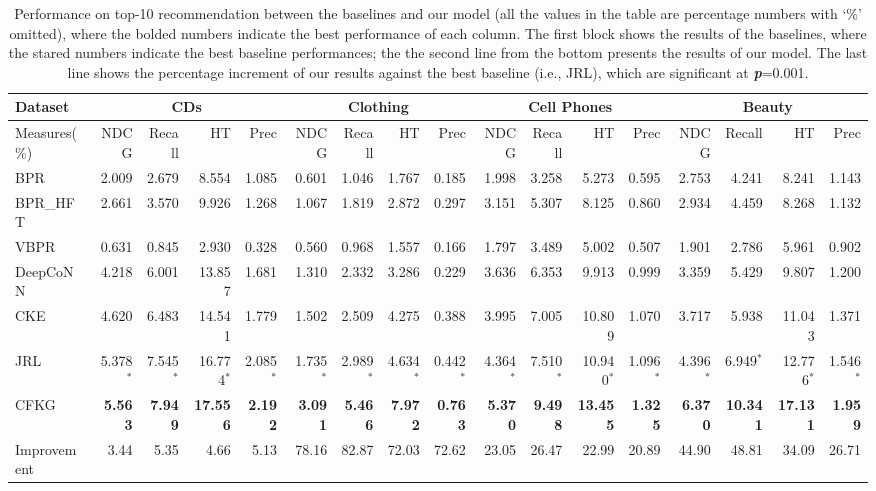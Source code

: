 \documentclass[algorithms,article,accept,moreauthors,pdftex,10pt,a4paper]{Definitions/mdpi}
\begin{document}
\iffalse
\begin{table*}[t]
	\caption{Performance on top-10 recommendation between the baselines and our model (all the values in the table are percentage numbers with `\%' omitted), where the bolded numbers indicate the best performance of each column.
		The first block shows the results of the baselines, where the stared numbers indicate the best baseline performances; 
		the the second line from the bottom presents the results of our model. 
		The last line shows the percentage increment of our results against the best baseline (i.e., JRL), which are significant at \textit{\textbf{p}}=0.001.}
	\centering
	\vspace{-5pt}
	\setlength{\tabcolsep}{2pt}
	\begin{tabular}
		{l|rrrr|rrrr|rrrr|rrrr} \hline\hline
		Dataset &  \multicolumn{4}{c|}{CDs} & \multicolumn{4}{c|}{Clothing} & \multicolumn{4}{c|}{Cell Phones} & \multicolumn{4}{c}{Beauty}\\\hline
		Measures(\%) & NDCG & Recall & HT & Prec & NDCG & Recall & HT & Prec & NDCG & Recall & HT & Prec & NDCG & Recall & HT & Prec \\\hline
		BPR  & 2.009 & 2.679 & 8.554 & 1.085 & 0.601 & 1.046 & 1.767 & 0.185 & 1.998 & 3.258 & 5.273 & 0.595 & 2.753 & 4.241 & 8.241 & 1.143\\
		BPR\_HFT & 2.661 & 3.570 & 9.926 & 1.268 & 1.067 & 1.819 & 2.872 & 0.297 & 3.151 & 5.307 & 8.125 & 0.860 & 2.934  & 4.459 & 8.268 & 1.132\\
		VBPR & 0.631 & 0.845 & 2.930 & 0.328 & 0.560 & 0.968 & 1.557 & 0.166 & 1.797 & 3.489 & 5.002 & 0.507 & 1.901 & 2.786 & 5.961 & 0.902\\
		DeepCoNN  & 4.218 & 6.001 & 13.857 & 1.681 & 1.310 & 2.332 & 3.286 & 0.229 & 3.636 & 6.353 & 9.913 & 0.999 & 3.359 & 5.429 & 9.807 & 1.200\\
		CKE  & 4.620 & 6.483 & 14.541 & 1.779 & 1.502 & 2.509 & 4.275 & 0.388 & 3.995 & 7.005 & 10.809 & 1.070 & 3.717 & 5.938 & 11.043 & 1.371\\
		JRL & {5.378}$^*$ & {7.545}$^*$ & {16.774}$^*$ & {2.085}$^*$ & {1.735}$^*$ & {2.989}$^*$ & {4.634}$^*$ & {0.442}$^*$ & {4.364}$^*$ & {7.510}$^*$ & {10.940}$^*$ & {1.096}$^*$ & {4.396}$^*$ & {6.949}$^*$ & {12.776}$^*$ & {1.546}$^*$\\\hline
		CFKG & \textbf{5.563} & \textbf{7.949} & \textbf{17.556} & \textbf{2.192} & \textbf{3.091} & \textbf{5.466} & \textbf{7.972} & \textbf{0.763} & \textbf{5.370} & \textbf{9.498} & \textbf{13.455} & \textbf{1.325} & \textbf{6.370} & \textbf{10.341} & \textbf{17.131} & \textbf{1.959}\\\hline
		Improvement & 3.44 & 5.35  & 4.66 & 5.13 & 78.16 & 82.87 & 72.03 & 72.62 & 23.05 & 26.47 & 22.99 & 20.89 & 44.90 & 48.81 & 34.09 & 26.71\\\hline
	\end{tabular}\label{tab:result}
\end{table*}
\end{document}
